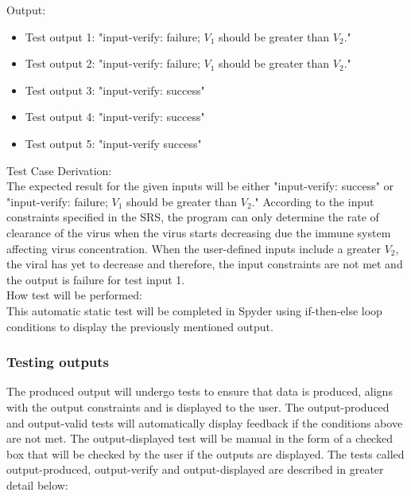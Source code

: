 \documentclass[12pt, titlepage]{article}
\begin{document}
\begin{enumerate}
\begin{enumerate}
\begin{itemize}
\end{itemize}

Output: 
\begin{itemize}
\item Test output 1: "input-verify: failure; $V_1$ should be greater than 
$V_2$."
\item Test output 2: "input-verify: failure; $V_1$ should be greater than 
$V_2$." 
\item Test output 3: "input-verify: success"
\item Test output 4: "input-verify: success"
\item Test output 5: "input-verify success"
\end{itemize}

Test Case Derivation:\\
The expected result for the given inputs will be either "input-verify: success" 
or  "input-verify: failure; $V_1$ should be greater than $V_2$." According to 
the input constraints specified in the SRS, the program can only determine the 
rate of clearance of the virus when the virus starts decreasing due the immune 
system affecting virus concentration. When the user-defined inputs include a 
greater $V_2$, the viral has yet to decrease and therefore, the input 
constraints are not met and the output is failure for test input 1.\\

How test will be performed: \\
This automatic static test will be completed in Spyder using if-then-else loop 
conditions to display the previously mentioned output. \\

\end{enumerate}
					
\subsubsection{Testing outputs}

The produced output will undergo tests to ensure that data is produced, aligns 
with the output constraints and is displayed to the user. The output-produced 
and output-valid tests will automatically display feedback if the conditions 
above are not met. The output-displayed test will be manual in the form of a 
checked box that will be checked by the user if the outputs are displayed. The 
tests called output-produced, output-verify and output-displayed are described 
in greater detail below: 
		

\end{enumerate}
\end{document}
